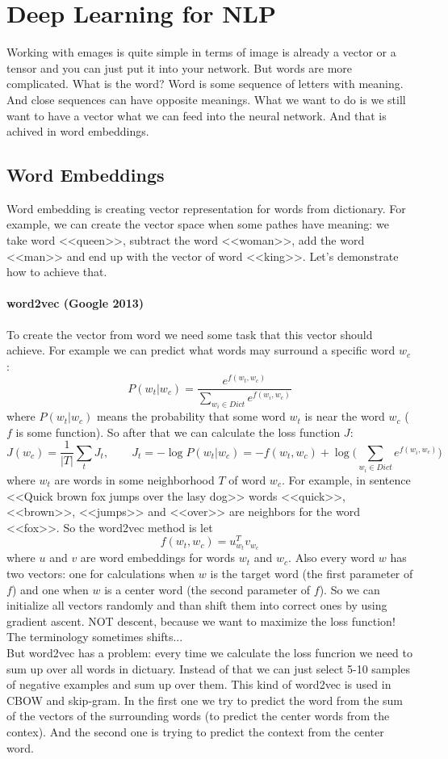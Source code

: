 \chapter{Deep Learning for NLP}

{\sf Working with emages is quite simple in terms of image is already a vector or a tensor and you can just put it into your network. But words are more complicated. What is the word? Word is some sequence of letters with meaning. And close sequences can have opposite meanings. What we want to do is we still want to have a vector what we can feed into the neural network. And that is achived in word embeddings.}

\section{Word Embeddings}

Word embedding is creating vector representation for words from dictionary. For example, we can create the vector space when some pathes have meaning: we take word <<queen>>, subtract the word <<woman>>, add the word <<man>> and end up with the vector of word <<king>>. Let's demonstrate how to achieve that.

\subsubsection*{word2vec (Google 2013)}

To create the vector from word we need some task that this vector should achieve. For example we can predict what words may surround a specific word $w_c$:
$$P(w_t|w_c)=\frac{e^{f(w_t,w_c)}}{\sum\limits_{w_i\in Dict}e^{f(w_i,w_c)}}$$
where $P(w_t|w_c)$ means the probability that some word $w_t$ is near the word $w_c$ ($f$ is some function). So after that we can calculate the loss function $J$:
$$J(w_c)=\frac{1}{|T|}\sum\limits_{t}J_t,\qquad J_t=-\log P(w_t|w_c)=-f(w_t,w_c)+\log\Big(\sum\limits_{w_i\in Dict}e^{f(w_i,w_c)}\Big)$$
where $w_t$ are words in some neighborhood $T$ of word $w_c$. For example, in sentence <<Quick brown fox jumps over the lasy dog>> words <<quick>>, <<brown>>, <<jumps>> and <<over>> are neighbors for the word <<fox>>. So the word2vec method is let
$$f(w_t,w_c)=u_{w_t}^Tv_{w_c}$$
where $u$ and $v$ are word embeddings for words $w_t$ and $w_c$. Also every word $w$ has two vectors: one for calculations when $w$ is the target word (the first parameter of $f$) and one when $w$ is a center word (the second parameter of $f$). So we can initialize all vectors randomly and than shift them into correct ones by using gradient ascent. NOT descent, because we want to maximize the loss function! The terminology sometimes shifts...\\
But word2vec has a problem: every time we calculate the loss funcrion we need to sum up over all words in dictuary. Instead of that we can just select 5-10 samples of negative examples and sum up over them. This kind of word2vec is used in CBOW and skip-gram. In the first one we try to predict the word from the sum of the vectors of the surrounding words (to predict the center words from the contex). And the second one is trying to predict the context from the center word.

